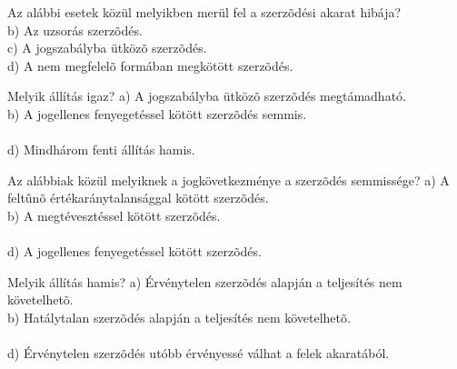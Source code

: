 \begin{frame}

\begin{tcolorbox}[title={156. Kérdés}]
Az alábbi esetek közül melyikben merül fel a szerzõdési akarat hibája?
\tcblower
{}\\
b) Az uzsorás szerzõdés.\\
c) A jogszabályba ütközõ szerzõdés.\\
d) A nem megfelelõ formában megkötött szerzõdés.
\end{tcolorbox}

\begin{tcolorbox}[title={157. Kérdés}]
Melyik állítás igaz?
\tcblower
a) A jogszabályba ütközõ szerzõdés megtámadható.\\
b) A jogellenes fenyegetéssel kötött szerzõdés semmis.\\
\\
d) Mindhárom fenti állítás hamis.
\end{tcolorbox}

\begin{tcolorbox}[title={158. Kérdés}]
Az alábbiak közül melyiknek a jogkövetkezménye a szerzõdés semmissége?
\tcblower
a) A feltûnõ értékaránytalansággal kötött szerzõdés.\\
b) A megtévesztéssel kötött szerzõdés.\\
\\
d) A jogellenes fenyegetéssel kötött szerzõdés.
\end{tcolorbox}

\begin{tcolorbox}[title={159. Kérdés}]
Melyik állítás hamis?
\tcblower
a) Érvénytelen szerzõdés alapján a teljesítés nem követelhetõ.\\
b) Hatálytalan szerzõdés alapján a teljesítés nem követelhetõ.\\
\\
d) Érvénytelen szerzõdés utóbb érvényessé válhat a felek akaratából.
\end{tcolorbox}

\end{frame}


